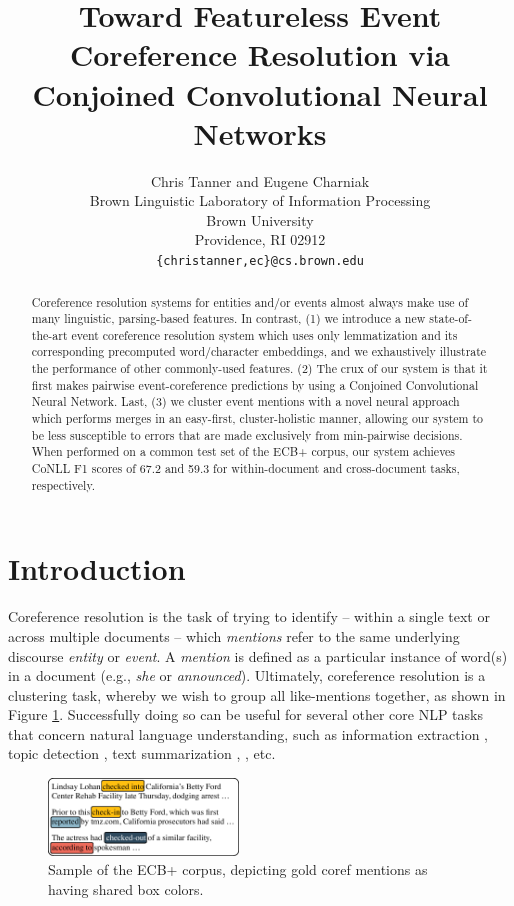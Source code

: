 \documentclass[11pt,a4paper]{article}
\title{Toward Featureless Event Coreference Resolution via Conjoined Convolutional Neural Networks}
\author{Chris Tanner \textnormal{and} Eugene Charniak\\
Brown Linguistic Laboratory of Information Processing \\
  Brown University \\
  Providence, RI  02912 \\
  {\tt \{christanner,ec\}@cs.brown.edu} \\}
\date{}
\begin{document}
\maketitle
\begin{abstract}
Coreference resolution systems for entities and/or events almost always make use of many linguistic, parsing-based features.  In contrast, (1) we introduce a new state-of-the-art event coreference resolution system which uses only lemmatization and its corresponding precomputed word/character embeddings, and we exhaustively illustrate the performance of other commonly-used features.  (2) The crux of our system is that it first makes pairwise event-coreference predictions by using a Conjoined Convolutional Neural Network.  Last, (3) we cluster event mentions with a novel neural approach which performs merges in an easy-first, cluster-holistic manner, allowing our system to be less susceptible to errors that are made exclusively from min-pairwise decisions.  When performed on a common test set of the ECB+ corpus, our system achieves CoNLL F1 scores of 67.2 and 59.3 for within-document and cross-document tasks, respectively.
\end{abstract}


\section{Introduction}
Coreference resolution is the task of trying to identify -- within a single text or across multiple documents -- which \textit{mentions} refer to the same underlying discourse \textit{entity} or \textit{event}.  A \textit{mention} is defined as a particular instance of word(s) in a document (e.g., \textit{she} or \textit{announced}).  Ultimately, coreference resolution is a clustering task, whereby we wish to group all like-mentions together, as shown in Figure \ref{fig:corpus}.  Successfully doing so can be useful for several other core NLP tasks that concern natural language understanding, such as information extraction \cite{Humphreys:1997}, topic detection \cite{Allan:1998}, text summarization \cite{Daniel:2003}, \cite{Narayanan:2004:QAB:1220355.1220455}, etc.

\begin{figure}[ht]
\centering
	\includegraphics[width=0.45\textwidth]{corpus}
	\caption{Sample of the ECB+ corpus, depicting gold coref mentions as having shared box colors.}
	\label{fig:corpus}
\end{figure}
\end{document}
